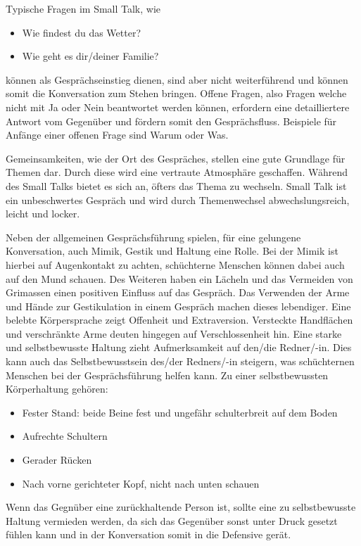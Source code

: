 Typische Fragen im Small Talk, wie
\begin{itemize}
    \item Wie findest du das Wetter?
    \item Wie geht es dir/deiner Familie?
\end{itemize}
können als Gesprächseinstieg dienen, sind aber nicht weiterführend und können somit die Konversation zum Stehen bringen.  \newline
Offene Fragen, also Fragen welche nicht mit \glqq{}Ja\grqq{} oder \glqq{}Nein\grqq{} beantwortet werden können, erfordern eine detailliertere Antwort vom Gegenüber und fördern somit den
Gesprächsfluss. Beispiele für Anfänge einer offenen Frage sind \glqq{}Warum\grqq{} oder \glqq{}Was\grqq{}.

Gemeinsamkeiten, wie der Ort des Gespräches, stellen eine gute Grundlage für Themen dar. Durch diese wird eine vertraute Atmosphäre geschaffen. \cite[S.~104]{Birgelen:Ich-und-der-Kunde} \newline
Während des Small Talks bietet es sich an, öfters das Thema zu wechseln. Small Talk ist ein unbeschwertes Gespräch und wird durch Themenwechsel abwechslungsreich, leicht und locker. \cite[S.~108]{Birgelen:Ich-und-der-Kunde}

Neben der allgemeinen Gesprächsführung spielen, für eine gelungene Konversation, auch Mimik, Gestik und Haltung eine Rolle. \newline
Bei der Mimik ist hierbei auf Augenkontakt zu achten, schüchterne Menschen können dabei auch auf den Mund schauen. Des Weiteren haben ein Lächeln und das Vermeiden von Grimassen einen
positiven Einfluss auf das Gespräch. \newline
Das Verwenden der Arme und Hände zur Gestikulation in einem Gespräch machen dieses lebendiger. Eine belebte Körpersprache zeigt Offenheit und Extraversion. Versteckte Handflächen
und verschränkte Arme deuten hingegen auf Verschlossenheit hin. \cite[S.~119]{Birgelen:Ich-und-der-Kunde} \newline
Eine starke und selbstbewusste Haltung zieht Aufmerksamkeit auf den/die Redner/-in. Dies kann auch das Selbstbewusstsein des/der Redners/-in steigern, was schüchternen Menschen bei der
Gesprächsführung helfen kann. Zu einer selbstbewussten Körperhaltung gehören: \cite{misc:rhetorik_selbstbewusstsein}
\begin{itemize}
    \item Fester Stand: beide Beine fest und ungefähr schulterbreit auf dem Boden
    \item Aufrechte Schultern
    \item Gerader Rücken
    \item Nach vorne gerichteter Kopf, nicht nach unten schauen
\end{itemize}
Wenn das Gegnüber eine zurückhaltende Person ist, sollte eine zu selbstbewusste Haltung vermieden werden, da sich das Gegenüber sonst unter Druck gesetzt fühlen kann und in der Konversation somit
in die Defensive gerät.

